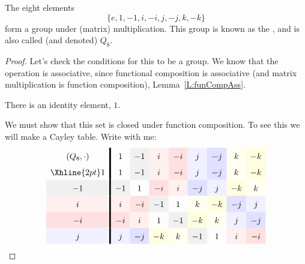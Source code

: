 \documentclass{ximera}
\begin{document}
\begin{example}
  The eight elements
  \[
  \{e,1,-1,i,-i,j,-j,k,-k\}
  \]
  form a group under (matrix) multiplication. This group is known as
  the , and is also called (and denoted)
  $Q_{8}$.
  \begin{proof}
    Let's check the conditions for this to be a group. We know that
    the operation is associative, since functional composition is
    associative (and matrix multiplication is function composition),
    Lemma~\ref{L:funCompAss}.

    There is an identity element, $1$.
    
    We must show that this set is closed under function composition.
    To see this we will make a Cayley table. Write with me:
    \begin{gather*}
    \renewcommand{\arraystretch}{1.6}
    \begin{array}{c!{\vline width 2pt}cccccccc}
      (Q_8,\cdot) & 1 & -1 \cellcolor{black!6!white} & i \cellcolor{red!6!white} & -i \cellcolor{red!12!white} & j \cellcolor{blue!6!white} & -j \cellcolor{blue!12!white} & k \cellcolor{yellow!6!white} & -k \cellcolor{yellow!12!white} \\ \Xhline{2pt}
      1 & 1 & -1 \cellcolor{black!6!white} & i \cellcolor{red!6!white} & -i \cellcolor{red!12!white} & j \cellcolor{blue!6!white} & -j \cellcolor{blue!12!white} & k \cellcolor{yellow!6!white} & -k \cellcolor{yellow!12!white} \\
      -1 \cellcolor{black!6!white}& -1 \cellcolor{black!6!white} & 1 & -i \cellcolor{red!12!white} & i \cellcolor{red!6!white} & -j \cellcolor{blue!12!white} & j \cellcolor{blue!6!white} & -k \cellcolor{yellow!12!white} & k \cellcolor{yellow!6!white} \\
      i \cellcolor{red!6!white}& i \cellcolor{red!6!white} & -i \cellcolor{red!12!white} & -1 \cellcolor{black!6!white}  & 1 & k \cellcolor{yellow!6!white} & -k \cellcolor{yellow!12!white} & -j \cellcolor{blue!12!white} & j \cellcolor{blue!6!white} \\
      -i \cellcolor{red!12!white}& -i \cellcolor{red!12!white} & i \cellcolor{red!6!white} & 1  & -1  \cellcolor{black!6!white}& -k \cellcolor{yellow!12!white} & k \cellcolor{yellow!6!white} & j \cellcolor{blue!6!white} & -j \cellcolor{blue!12!white} \\
      j \cellcolor{blue!6!white}& j \cellcolor{blue!6!white} & -j \cellcolor{blue!12!white} & -k \cellcolor{yellow!12!white}  & k\cellcolor{yellow!6!white} & -1 \cellcolor{black!6!white} & 1  & i \cellcolor{red!6!white} & -i \cellcolor{red!12!white} \\

\end{array}
\end{gather*}
\end{proof}
\end{example}
\end{document}
